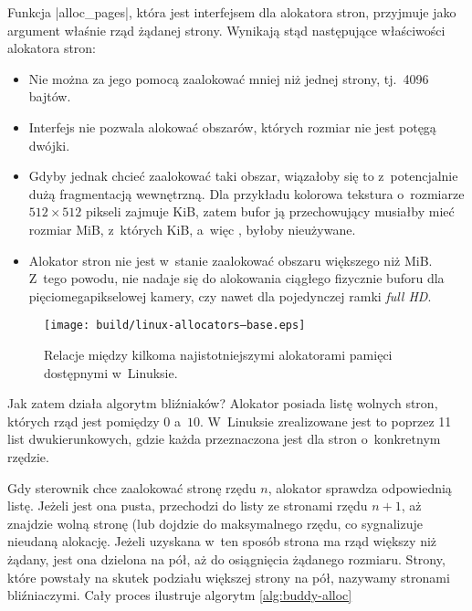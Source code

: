 Funkcja \code|alloc_pages|, która jest interfejsem dla alokatora
stron, przyjmuje jako argument właśnie rząd żądanej strony.  Wynikają
stąd następujące właściwości alokatora stron:

\begin{itemize}
\item Nie można za jego pomocą zaalokować mniej niż jednej strony,
  tj.\ 4096 bajtów.
\item Interfejs nie pozwala alokować obszarów, których rozmiar nie
  jest potęgą dwójki.
\item Gdyby jednak chcieć zaalokować taki obszar, wiązałoby się to
  z~potencjalnie dużą fragmentacją wewnętrzną.  Dla przykładu kolorowa
  tekstura o~rozmiarze $512 \times 512$ pikseli zajmuje
  \unit[768]{KiB}, zatem bufor ją przechowujący musiałby mieć rozmiar
  \unit[1]{MiB}, z~których \unit[256]{KiB}, a~więc ,
  byłoby nieużywane.
\item Alokator stron nie jest w~stanie zaalokować obszaru większego
  niż \unit[4]{MiB}.  Z~tego powodu, nie nadaje się do alokowania
  ciągłego fizycznie buforu dla pięciomegapikselowej kamery, czy nawet
  dla pojedynczej ramki {\it full HD}.
\end{itemize}

\begin{figure}[tbp]
  \centering
  \texttt{[image: build/linux-allocators--base.eps]}
  \caption[Alokatory dostępne w~jądrze Linux.]{Relacje między kilkoma
    najistotniejszymi alokatorami pamięci dostępnymi w~Linuksie.}
  \label{fig:allocators-base}
\end{figure}

Jak zatem działa algorytm bliźniaków?  Alokator posiada listę wolnych
stron, których rząd jest pomiędzy $0$ a~$10$.  W~Linuksie zrealizowane
jest to poprzez 11 list dwukierunkowych, gdzie każda przeznaczona jest
dla stron o~konkretnym rzędzie.

Gdy sterownik chce zaalokować stronę rzędu $n$, alokator sprawdza
odpowiednią listę.  Jeżeli jest ona pusta, przechodzi do listy ze
stronami rzędu $n+1$, aż znajdzie wolną stronę (lub dojdzie do
maksymalnego rzędu, co sygnalizuje nieudaną alokację.  Jeżeli uzyskana
w~ten sposób strona ma rząd większy niż żądany, jest ona dzielona na
pół, aż do osiągnięcia żądanego rozmiaru.  Strony, które powstały na
skutek podziału większej strony na pół, nazywamy stronami
bliźniaczymi.  Cały proces ilustruje algorytm \ref{alg:buddy-alloc}

